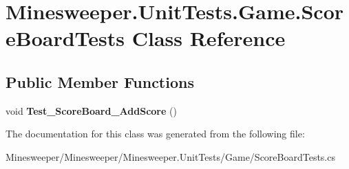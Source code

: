 \hypertarget{class_minesweeper_1_1_unit_tests_1_1_game_1_1_score_board_tests}{\section{Minesweeper.\+Unit\+Tests.\+Game.\+Score\+Board\+Tests Class Reference}
\label{class_minesweeper_1_1_unit_tests_1_1_game_1_1_score_board_tests}
}
\subsection*{Public Member Functions}
\begin{DoxyCompactItemize}
\item 
\hypertarget{class_minesweeper_1_1_unit_tests_1_1_game_1_1_score_board_tests_ad61287c5e951c46e83e5415e721f84c7}{void {\bfseries Test\+\_\+\+Score\+Board\+\_\+\+Add\+Score} ()}\label{class_minesweeper_1_1_unit_tests_1_1_game_1_1_score_board_tests_ad61287c5e951c46e83e5415e721f84c7}

\end{DoxyCompactItemize}


The documentation for this class was generated from the following file\+:\begin{DoxyCompactItemize}
\item 
Minesweeper/\+Minesweeper/\+Minesweeper.\+Unit\+Tests/\+Game/Score\+Board\+Tests.\+cs\end{DoxyCompactItemize}
